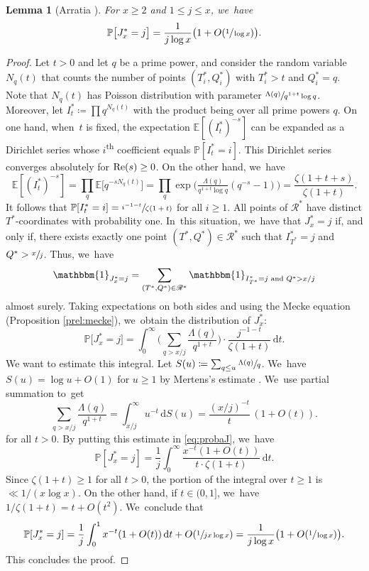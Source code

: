 \documentclass[JEP,XML,SOM,Unicode,published]{cedram}
\newcommand{\PP}{\mathbb{P}}
\newcommand{\EE}{\mathbb{E}}
\newcommand{\one}{\mathbbm{1}}
\newcommand{\RS}{\mathscr{R}}
\newcommand{\bigoo}[1]{O\!\left(#1 \right)}
\newcommand{\riemint}[4]{\int_{#1}^{#2}\! #3 \, \mathrm{d}#4}
\renewcommand{\Re}{\textup{Re}}
\newcommand{\bg}{\big}
\newcommand{\bgg}{\Big}
\theoremstyle{plain}
\newtheorem{lem}[cor]{Lemma}
\theoremstyle{definition}
\begin{document}
\begin{lem}[Arratia \cite{Arratia02}]
\label{lem:probaj}
For $x \ge 2$ and $1 \le j \le x$, we~have
\[
\PP\bg[J_x^*=j\bg] = \frac{1}{j\log x}\bigl(1+\bigoo{\sfrac{1}{\log x}} \bigr).
\]
\end{lem}

\begin{proof}
Let $t>0$ and let $q$ be a prime power, and consider the random variable $N_q(t)$ that counts the number of points $(T^*_i, Q^*_i)$ with $T^*_i > t$ and $Q^*_i = q$. Note that $N_q(t)$ has Poisson distribution with parameter $\sfrac{\Lambda(q)}{q^{1+t}\log q}$. Moreover, let $I^*_t \coloneqq \prod q^{N_q(t)}$ with the product being over all prime powers $q$. On one hand, when~$t$ is fixed, the expectation $\EE[(I^*_t)^{-s}]$ can be expanded as a Dirichlet series whose $i$\textsuperscript{th} coefficient equals $\PP[I^*_t = i]$. This Dirichlet series converges absolutely for $\Re(s)\ge0$. On the other hand, we~have
\[
\EE[(I^*_t)^{-s}] = \prod_q \EE\bg[q^{-sN_q(t)}\bg] = \prod_q \exp\!\bgg(\tfrac{\Lambda(q)}{q^{1+t}\log q} (q^{-s}-1)\bgg) = \frac{\zeta(1+t+s)}{\zeta(1+t)}.
\]
It follows that $\PP[I^*_t = i] = \sfrac{i^{-1-t}}{\zeta(1+t)}$ for all $i \ge 1$. All points of $\RS^*$ have distinct $T^*$-coordinates with probability one. In~this situation, we~have that $J_x^* = j$ if, and only if, there exists exactly one point $(T^*, Q^*) \in \RS^*$ such that $I^*_{T^*} = j$ and $Q^* > \sfrac{x}{j}$. Thus, we~have
\[
\one _{J_x^* = j} = \sum_{(T^*, Q^*) \in \RS^*} \one _{I^*_{T^*} = j \text{ and } Q^{*}> x/j}
\]
almost surely. Taking expectations on both sides and using the Mecke equation (Proposition \ref{prel:mecke}), we~obtain the distribution of $J_x^*$:
\begin{equation}
\label{eq:probaJ}
\PP\bg[J_x^*=j\bg]
= \riemint{0}{\infty}{\bigg(\sum_{q > x/j} \frac{\Lambda(q)}{q^{1+t}}\bigg)\cdot \frac{j^{-1-t}}{\zeta(1+t)}}{t}.
\end{equation}
We want to estimate this integral. Let $S(u) \coloneqq \sum_{q \le u} \sfrac{\Lambda(q)}{q}$. We~have $S(u) = \log u + O(1)$ for $u \ge 1$ by Mertens's estimate \cite[Th.\,3.4(a)]{Koukoulo19}. We~use partial summation to~get
\[
\sum_{q > x/j} \frac{\Lambda(q)}{q^{1+t}} = \riemint{x/j}{\infty}{u^{-t}}{S(u)} = \frac{(x/j)^{-t}}{t}\,(1+O(t)).
\]
for all $t > 0$. By putting this estimate in \eqref{eq:probaJ}, we~have
\[
\PP[J_x^* = j] = \frac{1}{j} \riemint{0}{\infty}{\frac{x^{-t}(1+O(t))}{t\cdot \zeta(1+t)}}{t}.
\]
Since $\zeta(1+t)\ge1$ for all $t>0$, the portion of the integral over $t\ge1$ is $\ll 1/(x\log x)$. On the other hand, if $t\in(0,1]$, we~have $1/\zeta(1+t)=t+O(t^2)$. We~conclude that
\[
\PP[J_x^* = j] = \frac{1}{j} \int_0^1 x^{-t}(1+O(t)) \,\mathrm dt + O(\sfrac{1}{jx\log x}) = \frac{1}{j\log x}\bg(1+O(\sfrac{1}{\log x})\bg).
\]
This concludes the proof.
\end{proof}
\end{document}
